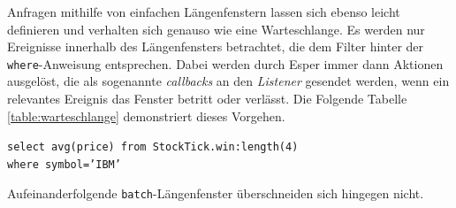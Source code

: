 \documentclass{acm_proc_article-sp}
\begin{document}
Anfragen mithilfe von einfachen Längenfenstern lassen sich ebenso leicht definieren und 
verhalten sich genauso wie eine Warteschlange. Es werden nur Ereignisse innerhalb des 
Längenfensters betrachtet, die dem Filter hinter der \texttt{where}-Anweisung 
entsprechen. Dabei werden durch Esper immer dann Aktionen ausgelöst, die als sogenannte 
\textit{callbacks} an den \textit{Listener} gesendet werden, wenn ein relevantes Ereignis 
das Fenster betritt oder verlässt. Die Folgende Tabelle \ref{table:warteschlange} 
demonstriert dieses Vorgehen.

\texttt{select avg(price) from StockTick.win:length(4)\\where symbol='IBM'}

\begin{table}[ht]
    \caption{Längenfenster}
    \label{table:warteschlange}\vspace{0.2cm}
\end{table}

Aufeinanderfolgende \texttt{batch}-Längenfenster überschneiden sich hingegen nicht.
\end{document}
